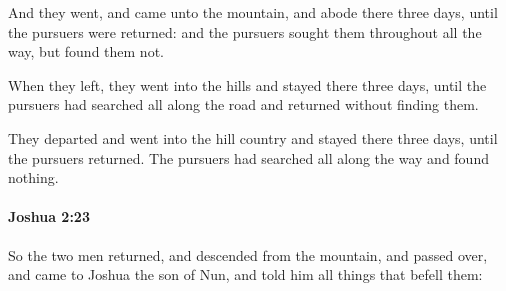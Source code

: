 			\begin{versebox}
					\item[BHS] 
					\item[ASV] And they went, and came unto the mountain, and abode there three days, until the pursuers were returned: and the pursuers sought them throughout all the way, but found them not.
					\item[NIV] When they left, they went into the hills and stayed there three days, until the pursuers had searched all along the road and returned without finding them.
					\item[NRSV] They departed and went into the hill country and stayed there three days, until the pursuers returned. The pursuers had searched all along the way and found nothing.
			\end{versebox}

		\paragraph{Joshua 2:23} %
			\label{JOSHUA-2-23}

			So the two men returned, and descended from the mountain, and passed over, and came to Joshua the son of Nun, and told him all things that befell them:

